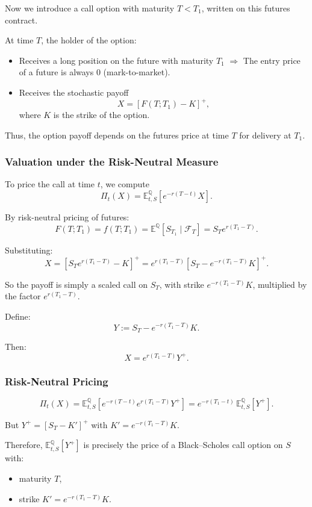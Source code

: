 \documentclass[12pt,a4paper]{article}
\theoremstyle{definition}
\newcommand{\Q}{\mathbb{Q}}
\newcommand{\E}{\mathbb{E}}
\begin{document}
Now we introduce a call option with maturity $T < T_1$, written on this futures contract.

At time $T$, the holder of the option:
\begin{itemize}
\item Receives a long position on the future with maturity $T_1$ $\Rightarrow$ The entry price of a future is always 0 (mark-to-market).
\item Receives the stochastic payoff
\[
X = [F(T; T_1) - K]^+,
\]
where $K$ is the strike of the option.
\end{itemize}

Thus, the option payoff depends on the futures price at time $T$ for delivery at $T_1$.

\subsubsection{Valuation under the Risk-Neutral Measure}

To price the call at time $t$, we compute
\[
\Pi_t(X) = \E_{t,S}^\Q[e^{-r(T-t)} X].
\]

By risk-neutral pricing of futures:
\[
F(T; T_1) = f(T; T_1) = \E^\Q[S_{T_1} \mid \mathcal{F}_T] = S_T e^{r(T_1 - T)}.
\]

Substituting:
\[
X = [S_T e^{r(T_1 - T)} - K]^+ = e^{r(T_1 - T)} [S_T - e^{-r(T_1 - T)} K]^+.
\]

So the payoff is simply a scaled call on $S_T$, with strike $e^{-r(T_1 - T)} K$, multiplied by the factor $e^{r(T_1 - T)}$.

Define:
\[
Y := S_T - e^{-r(T_1 - T)} K.
\]

Then:
\[
X = e^{r(T_1 - T)} Y^+.
\]

\subsubsection{Risk-Neutral Pricing}

\[
\Pi_t(X) = \E_{t,S}^\Q[e^{-r(T-t)} e^{r(T_1 - T)} Y^+] = e^{-r(T_1 - t)} \, \E_{t,S}^\Q[Y^+].
\]

But $Y^+ = [S_T - K']^+$ with $K' = e^{-r(T_1 - T)} K$.

Therefore, $\E_{t,S}^\Q[Y^+]$ is precisely the price of a Black–Scholes call option on $S$ with:
\begin{itemize}
\item maturity $T$,
\item strike $K' = e^{-r(T_1 - T)} K$.
\end{itemize}
\end{document}
